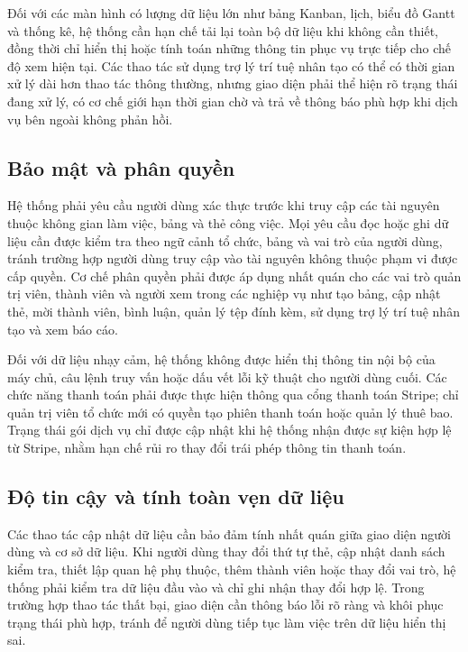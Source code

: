 \documentclass[../DoAn.tex]{subfiles}
\begin{document}
Đối với các màn hình có lượng dữ liệu lớn như bảng Kanban, lịch, biểu đồ Gantt và thống kê, hệ thống cần hạn chế tải lại toàn bộ dữ liệu khi không cần thiết, đồng thời chỉ hiển thị hoặc tính toán những thông tin phục vụ trực tiếp cho chế độ xem hiện tại. Các thao tác sử dụng trợ lý trí tuệ nhân tạo có thể có thời gian xử lý dài hơn thao tác thông thường, nhưng giao diện phải thể hiện rõ trạng thái đang xử lý, có cơ chế giới hạn thời gian chờ và trả về thông báo phù hợp khi dịch vụ bên ngoài không phản hồi.

\subsection{Bảo mật và phân quyền}
\label{subsection:2.4.2}

Hệ thống phải yêu cầu người dùng xác thực trước khi truy cập các tài nguyên thuộc không gian làm việc, bảng và thẻ công việc. Mọi yêu cầu đọc hoặc ghi dữ liệu cần được kiểm tra theo ngữ cảnh tổ chức, bảng và vai trò của người dùng, tránh trường hợp người dùng truy cập vào tài nguyên không thuộc phạm vi được cấp quyền. Cơ chế phân quyền phải được áp dụng nhất quán cho các vai trò quản trị viên, thành viên và người xem trong các nghiệp vụ như tạo bảng, cập nhật thẻ, mời thành viên, bình luận, quản lý tệp đính kèm, sử dụng trợ lý trí tuệ nhân tạo và xem báo cáo.

Đối với dữ liệu nhạy cảm, hệ thống không được hiển thị thông tin nội bộ của máy chủ, câu lệnh truy vấn hoặc dấu vết lỗi kỹ thuật cho người dùng cuối. Các chức năng thanh toán phải được thực hiện thông qua cổng thanh toán Stripe; chỉ quản trị viên tổ chức mới có quyền tạo phiên thanh toán hoặc quản lý thuê bao. Trạng thái gói dịch vụ chỉ được cập nhật khi hệ thống nhận được sự kiện hợp lệ từ Stripe, nhằm hạn chế rủi ro thay đổi trái phép thông tin thanh toán.

\subsection{Độ tin cậy và tính toàn vẹn dữ liệu}
\label{subsection:2.4.3}

Các thao tác cập nhật dữ liệu cần bảo đảm tính nhất quán giữa giao diện người dùng và cơ sở dữ liệu. Khi người dùng thay đổi thứ tự thẻ, cập nhật danh sách kiểm tra, thiết lập quan hệ phụ thuộc, thêm thành viên hoặc thay đổi vai trò, hệ thống phải kiểm tra dữ liệu đầu vào và chỉ ghi nhận thay đổi hợp lệ. Trong trường hợp thao tác thất bại, giao diện cần thông báo lỗi rõ ràng và khôi phục trạng thái phù hợp, tránh để người dùng tiếp tục làm việc trên dữ liệu hiển thị sai.
\end{document}
